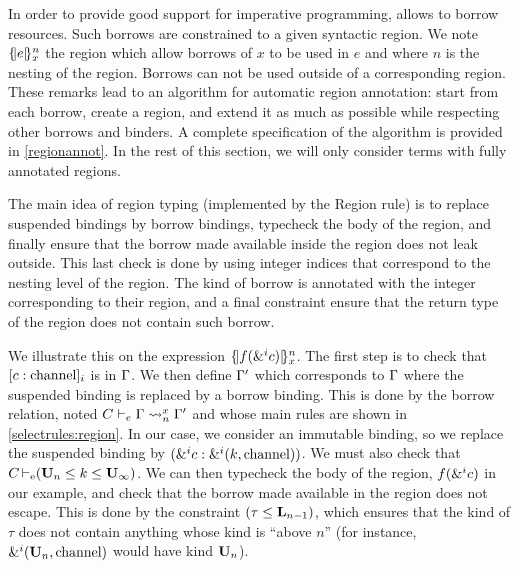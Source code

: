 In order to provide good support for imperative programming, \affe allows
to borrow resources.
Such borrows are constrained to a given syntactic region. We note
$\region{x}{e}$ the region which allow borrows of $x$ to be used in $e$
and where $n$ is the nesting of the region.
Borrows can not be used outside of a corresponding region.
These remarks lead to an
algorithm for automatic region annotation: start from each borrow, create
a region, and extend it as much as possible while respecting other borrows
and binders.
A complete specification of the algorithm is provided in \cref{regionannot}.
In the rest of this section, we will only consider terms
with fully annotated regions.

The main idea of region typing (implemented by the {\sc Region} rule)
is to replace suspended bindings by borrow bindings, typecheck the body
of the region, and finally ensure that the borrow made available inside
the region does not leak outside.
This last check is done by using integer indices that correspond to the nesting
level of the region. The kind of borrow is annotated with the integer
corresponding to their region, and a final constraint ensure that
the return type of the region does not contain such borrow.

We illustrate this on the expression $\region{x}{f(\borrow[\IBORROW]{c})}$.
The first step is to check that
$\svar[\IBORROW]{c}{\text{channel}}$ is in $\E$. We then define $\E'$ which
corresponds to $\E$ where the suspended binding is replaced by a borrow binding.
%
This is done by the borrow relation, noted $\lregion{C}{x}{\E}{\E'}$ and
whose main rules are shown in \cref{selectrules:region}.
In our case, we consider an immutable binding, so we replace the suspended
binding by $\bvar{\borrow[\IBORROW]{c}}{\borrowty[\IBORROW]{k}{\text{channel}}}$.
We must also check that $\entail{C}{(\kun_n\lk k\lk\kun_\infty)}$.
We can then typecheck the body of the region, $f(\borrow[\IBORROW]{c})$ in our example, and check that the borrow made available in the region does not escape.
This is done by the constraint $\Cleq{\tau}{\klin_{n-1}}$, which ensures
that the kind of $\tau$ does not contain anything whose kind is ``above $n$''
(for instance, $\borrowty[\IBORROW]{\kun_n}{\text{channel}}$ would have kind
$\kun_n$).

